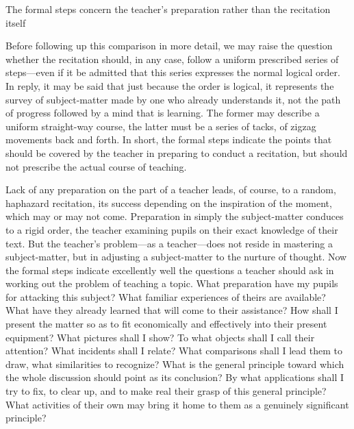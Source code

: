 \documentclass[letterpaper]{book}
\begin{document}
The formal steps concern the teacher's preparation rather than the
recitation itself

Before following up this comparison in more detail, we may raise the
question whether the recitation should, in any case, follow a uniform
prescribed series of steps---even if it be admitted that this series
expresses the normal logical order. In reply, it may be said that just
because the order is logical, it represents the survey of subject-matter
made by one who already understands it, not the path of progress
followed by a mind that is learning. The former may describe a uniform
straight-way course, the latter must be a series of tacks, of zigzag
movements back and forth. In short, the formal steps indicate the points
that should be covered by the teacher in preparing to conduct a
recitation, but should not prescribe the actual course of teaching.


Lack of any preparation on the part of a teacher leads, of course, to a
random, haphazard recitation, its success depending on the inspiration
of the moment, which may or may not come. Preparation in simply the
subject-matter conduces to a rigid order, the teacher examining pupils
on their exact knowledge of their text. But the teacher's problem---as a
teacher---does not reside in mastering a subject-matter, but in
adjusting a subject-matter to the nurture of thought. Now
the
formal steps indicate excellently well the questions a teacher should
ask in working out the problem of teaching a topic. What preparation
have my pupils for attacking this subject? What familiar experiences of
theirs are available? What have they already learned that will come to
their assistance? How shall I present the matter so as to fit
economically and effectively into their present equipment? What pictures
shall I show? To what objects shall I call their attention? What
incidents shall I relate? What comparisons shall I lead them to draw,
what similarities to recognize? What is the general principle toward
which the whole discussion should point as its conclusion? By what
applications shall I try to fix, to clear up, and to make real their
grasp of this general principle? What activities of their own may bring
it home to them as a genuinely significant principle?


\end{document}
